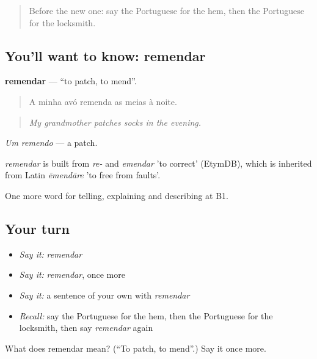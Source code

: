 \label{lesson:PT-C451-remendar}



\begin{quote}
Before the new one: say the Portuguese for the hem, then the Portuguese for the locksmith.
\end{quote}

\subsection*{You'll want to know: remendar}
\textbf{remendar} — \textquotedblleft{}to patch, to mend\textquotedblright{}.

\begin{quote}
A minha avó remenda as meias à noite.
\end{quote}

\begin{quote}
\emph{My grandmother patches socks in the evening.}
\end{quote}

\emph{Um remendo} — a patch.

\begin{cousinweb}
\emph{remendar} is built from \emph{re-} and \emph{emendar} 'to correct' (EtymDB), which is inherited from Latin \emph{ēmendāre} 'to free from faults'.
\end{cousinweb}

\begin{grammarlens}[title={What you've built}]
One more word for telling, explaining and describing at B1.
\end{grammarlens}

\subsection*{Your turn}
\begin{itemize}
\raggedright
  \item \emph{Say it:} \emph{remendar}
  \item \emph{Say it:} \emph{remendar}, once more
  \item \emph{Say it:} a sentence of your own with \emph{remendar}
  \item \emph{Recall:} say the Portuguese for the hem, then the Portuguese for the locksmith, then say \emph{remendar} again
\end{itemize}

\begin{tcolorbox}[breakable,colback=teal!4,colframe=teal!35!black,title={Before you move on}]
What does remendar mean? (\textquotedblleft{}To patch, to mend\textquotedblright{}.) Say it once more.
\end{tcolorbox}
